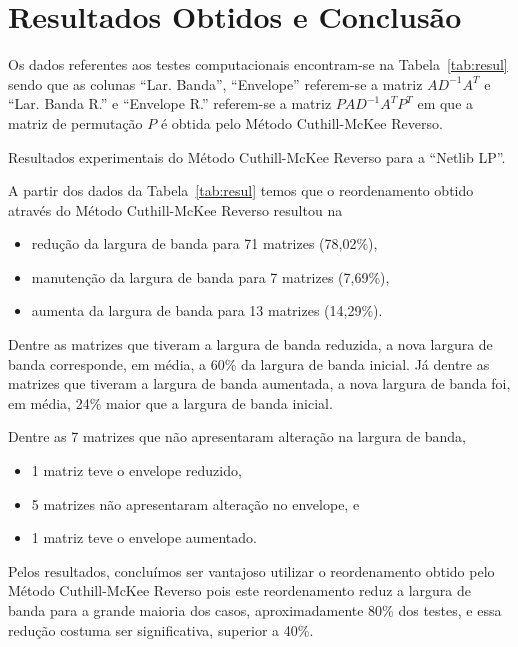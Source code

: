 \section{Resultados Obtidos e Conclusão}
Os dados referentes aos testes computacionais encontram-se na
Tabela~\ref{tab:resul} sendo que as colunas ``Lar. Banda'', ``Envelope''
referem-se a matriz $A D^{-1} A^T$ e ``Lar. Banda R.'' e ``Envelope R.''
referem-se a matriz $P A D^{-1} A^T P^T$ em que a matriz de permutação $P$ é
obtida pelo Método Cuthill-McKee Reverso.
\begin{table}
    \centering
    \caption{Resultados experimentais do Método Cuthill-McKee Reverso para
    a ``Netlib LP''.}
    \label{tab:resul}
\end{table}
\begin{table}
    \centering
\end{table}

A partir dos dados da Tabela~\ref{tab:resul} temos que o reordenamento obtido
através do Método Cuthill-McKee Reverso resultou na
\begin{itemize}
    \item redução da largura de banda para 71 matrizes (78,02\%),
    \item manutenção da largura de banda para 7 matrizes (7,69\%),
    \item aumenta da largura de banda para 13 matrizes (14,29\%).
\end{itemize}

Dentre as matrizes que tiveram a largura de banda reduzida, a nova largura de
banda corresponde, em média, a 60\% da largura de banda inicial. Já dentre as
matrizes que tiveram a largura de banda aumentada, a nova largura de banda foi,
em média, 24\% maior que a largura de banda inicial.

Dentre as 7 matrizes que não apresentaram alteração na largura de banda,
\begin{itemize}
    \item 1 matriz teve o envelope reduzido,
    \item 5 matrizes não apresentaram alteração no envelope, e
    \item 1 matriz teve o envelope aumentado.
\end{itemize}

Pelos resultados, concluímos ser vantajoso utilizar o reordenamento obtido pelo
Método Cuthill-McKee Reverso pois este reordenamento reduz a largura de banda
para a grande maioria dos casos, aproximadamente 80\% dos testes, e essa
redução costuma ser significativa, superior a 40\%.
